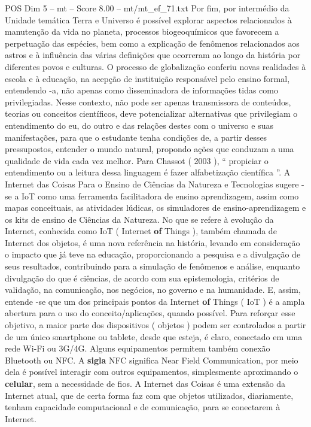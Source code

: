 \begin{textsample}{POS Dim 5 – mt – Score 8.00 – mt/mt\_ef\_71.txt}
Por fim, por intermédio da Unidade temática Terra e Universo é possível explorar aspectos relacionados à manutenção da vida no planeta, processos biogeoquímicos que favorecem a perpetuação das espécies, bem como a explicação de fenômenos relacionados aos astros e à influência das várias definições que ocorreram ao longo da história por diferentes povos e culturas.
O processo de globalização conferiu novas realidades à escola e à educação, na acepção de instituição responsável pelo ensino formal, entendendo -a, não apenas como disseminadora de informações tidas como privilegiadas.
Nesse contexto, não pode ser apenas transmissora de conteúdos, teorias ou conceitos científicos, deve potencializar alternativas que privilegiam o entendimento do eu, do outro e das relações destes com o universo e suas manifestações, para que o estudante tenha condições de, a partir desses pressupostos, entender o mundo natural, propondo ações que conduzam a uma qualidade de vida cada vez melhor.
Para Chassot ( 2003 ), “ propiciar o entendimento ou a leitura dessa linguagem é fazer alfabetização científica ”.
A Internet das Coisas Para o Ensino de Ciências da Natureza e Tecnologias sugere -se a IoT como uma ferramenta facilitadora de ensino aprendizagem, assim como mapas conceituais, as atividades lúdicas, os simuladores de ensino-aprendizagem e os kits de ensino de Ciências da Natureza.
No que se refere à evolução da Internet, conhecida como IoT ( Internet \textbf{of} Things ), também chamada de Internet dos objetos, é uma nova referência na história, levando em consideração o impacto que já teve na educação, proporcionando a pesquisa e a divulgação de seus resultados, contribuindo para a simulação de fenômenos e análise, enquanto divulgação do que é ciências, de acordo com sua epistemologia, critérios de validação, na comunicação, nos negócios, no governo e na humanidade.
E, assim, entende -se que um dos principais pontos da Internet \textbf{of} Things ( IoT ) é a ampla abertura para o uso do conceito/aplicações, quando possível.
Para reforçar esse objetivo, a maior parte dos dispositivos ( objetos ) podem ser controlados a partir de um único smartphone ou tablete, desde que esteja, é claro, conectado em uma rede Wi-Fi ou 3G/4G.
Alguns equipamentos permitem também conexão Bluetooth ou NFC.
A \textbf{sigla} NFC significa Near Field Communication, por meio dela é possível interagir com outros equipamentos, simplesmente aproximando o \textbf{celular}, sem a necessidade de fios.
A Internet das Coisas é uma extensão da Internet atual, que de certa forma faz com que objetos utilizados, diariamente, tenham capacidade computacional e de comunicação, para se conectarem à Internet.

\end{textsample}
